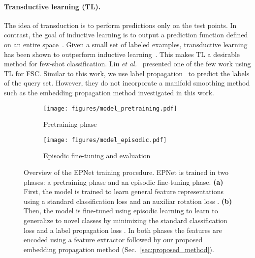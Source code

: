 \documentclass[runningheads]{llncs}
\begin{document}
\paragraph{Transductive learning (TL).}  The idea of transduction is to perform predictions only on the test points. In contrast, the goal of inductive learning is to output a prediction function defined on an entire space~\cite{vapnik1999overview}. Given a small set of labeled examples, transductive learning has been shown to outperform inductive learning~\cite{liu2018learning,iscen2019label,liu2019deep}. This makes TL a desirable method for few-shot classification. Liu \emph{et al.}~\cite{liu2018learning} presented one of the few work using TL for FSC. Similar to this work, we use label propagation~\cite{DBLP:conf/nips/ZhouBLWS03} to predict the labels of the query set. However, they do not incorporate a manifold smoothing method such as the embedding propagation method investigated in this work.



\begin{figure}[t!]
\centering
	\begin{subfigure}[t]{0.48\textwidth} \centering
		\texttt{[image: figures/model\_pretraining.pdf]}
		\caption{Pretraining phase} \label{fig:method1}
	\end{subfigure}
	\hfill
	\begin{subfigure}[t]{0.48\textwidth} \centering
		\texttt{[image: figures/model\_episodic.pdf]}
		\caption{Episodic fine-tuning and evaluation} \label{fig:method2}
	\end{subfigure}
	\caption{Overview of the EPNet training procedure. EPNet is trained in two phases: a pretraining phase and an episodic fine-tuning phase. \textbf{(a)} First, the model is trained to learn general feature representations using a standard classification loss  and an auxiliar rotation loss . \textbf{(b)} Then, the model is fine-tuned using episodic learning to learn to generalize to novel classes by minimizing the standard classification loss  and a label propagation loss . In both phases the features are encoded using a feature extractor followed by our proposed embedding propagation method (Sec.~\ref{sec:proposed_method}).} \label{fig:method}
\end{figure}
\end{document}
